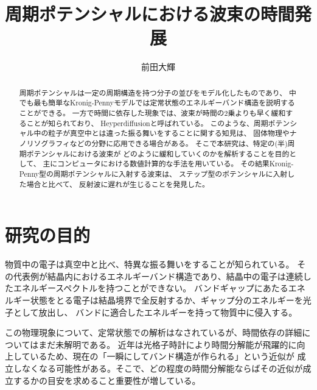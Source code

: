 \documentclass[autodetect-engine,dvipdfmx-if-dvi,ja=standard,a4paper,layout=v2]{bxjsreport}
\author{前田大輝}
\title{周期ポテンシャルにおける波束の時間発展}
\begin{document}
    \maketitle
    \begin{abstract}
        周期ポテンシャルは一定の周期構造を持つ分子の並びをモデル化したものであり、
        中でも最も簡単なKronig-Pennyモデルでは定常状態のエネルギーバンド構造を説明することができる。
        一方で時間に依存した現象では、波束が時間の2乗よりも早く緩和することが知られており、
        Heyperdiffusionと呼ばれている。
        このような、周期ポテンシャル中の粒子が真空中とは違った振る舞いをすることに関する知見は、
        固体物理やナノリソグラフィなどの分野に応用できる場合がある。
        そこで本研究は、特定の(半)周期ポテンシャルにおける波束が
        どのように緩和していくのかを解析することを目的として、
        主にコンピュータにおける数値計算的な手法を用いている。
        その結果Kronig-Penny型の周期ポテンシャルに入射する波束は、
        ステップ型のポテンシャルに入射した場合と比べて、
        反射波に遅れが生じることを発見した。
    \end{abstract}
    \tableofcontents
    \chapter{研究の目的}
    \begin{chapterabstract}
        物質中の電子は真空中と比べ、特異な振る舞いをすることが知られている。
        その代表例が結晶内におけるエネルギーバンド構造であり、結晶中の電子は連続したエネルギースペクトルを持つことができない。
        バンドギャップにあたるエネルギー状態をとる電子は結晶境界で全反射するか、ギャップ分のエネルギーを光子として放出し、
        バンドに適合したエネルギーを持って物質中に侵入する。\par
        この物理現象について、定常状態での解析はなされているが、時間依存の詳細についてはまだ未解明である。
        近年は光格子時計により時間分解能が飛躍的に向上しているため、現在の「一瞬にしてバンド構造が作られる」という近似が
        成立しなくなる可能性がある。そこで、どの程度の時間分解能ならばその近似が成立するかの目安を求めること重要性が増している。\par
    \end{chapterabstract}
\end{document}
